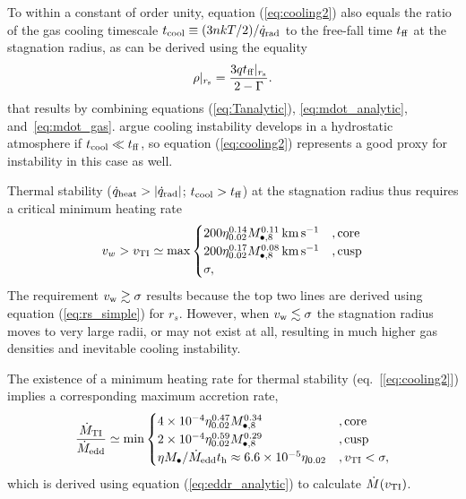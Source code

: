 \documentclass[usenatbib,fleqn]{mn2e}
\newcommand{\tff}{t_{\rm ff}}
\begin{document}
To within a constant of order unity, equation (\ref{eq:cooling2}) also equals the ratio of the gas cooling timescale $t_{\rm cool} \equiv (3n kT/2)/\dot{q}_{\rm rad}$ to the free-fall time $t_{\rm ff}$ at the stagnation radius, as can be derived using the equality 
\begin{align}
\rho|_{r_{\rm s}}=\frac{3 q\tff|_{r_{\rm s}}}{2-\Gamma}.
\label{eq:rhors2}
\end{align}
that results by combining equations (\ref{eq:Tanalytic}), \eqref{eq:mdot_analytic}, and~\eqref{eq:mdot_gas}.  \citet{McCourt+12} argue cooling instability develops in a hydrostatic atmosphere if $t_{\rm cool} \ll t_{\rm ff}$, so equation (\ref{eq:cooling2}) represents a good proxy for instability in this case as well.  

Thermal stability ($\dot{q}_{\rm heat} > |\dot{q}_{\rm rad}|$; $t_{\rm cool} > t_{\rm ff}$) at the stagnation radius thus requires a critical minimum heating rate
\begin{align}
v_{w} > v_{\rm TI} \simeq
  {\rm max}\begin{cases}
   200 \eta_{0.02}^{0.14} M_{\bullet,8}^{0.11}\,{\rm km\,s^{-1}}  &, \text{core}\\
   200 \eta_{0.02}^{0.17} M_{\bullet,8}^{0.08}\,{\rm km\,s^{-1}}   &, \text{cusp}\\
\sigma,     
  \end{cases}
  \label{eq:cooling3}
\end{align}
The requirement $v_{\rm w} \gtrsim \sigma$ results because the top two lines are derived using equation (\ref{eq:rs_simple}) for $r_s$.  However, when $v_{\rm w} \lesssim \sigma$ the stagnation radius moves to very large radii, or may not exist at all, resulting in much higher gas densities and inevitable cooling instability. 

The existence of a minimum heating rate for thermal stability (eq.~[\ref{eq:cooling2}]) implies a corresponding maximum accretion rate,
\begin{align}
\frac{\dot{M}_{\rm TI}}{\dot{M}_{\rm edd}} \simeq
  {\rm min}\begin{cases}
   4\times 10^{-4} \eta_{0.02}^{0.47} M_{\bullet,8}^{0.34} &, \text{core}\\
   2\times 10^{-4} \eta_{0.02}^{0.59} M_{\bullet,8}^{0.29}    &, \text{cusp}\\
\eta M_{\bullet}/\dot{M}_{\rm edd}t_{\rm h} \approx 6. 6\times 10^{-5}\eta_{0.02}&, v_{\rm TI} < \sigma,
  \end{cases}
  \label{eq:Mdotmax}
\end{align}
which is derived using equation (\ref{eq:eddr_analytic}) to calculate $\dot{M}(v_{\rm TI})$.
\end{document}
